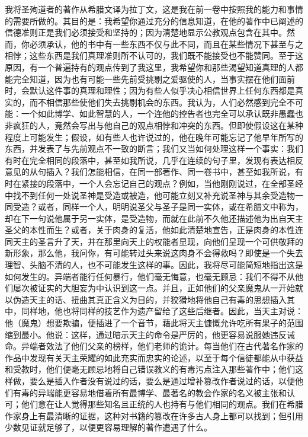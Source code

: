 我将圣殉道者的著作从希腊文译为拉丁文，这是我在前一卷中按照我的能力和事情的需要所做的。其目的是：我希望你通过充分的信息知道，在他的著作中已阐述的信德准则正是我们必须接受和坚持的；因为清楚地显示公教观点包含在其中。然而，你必须承认，他的书中有一些东西不仅与此不同，而且在某些情况下甚至与之相悖；这些东西是我们真理准则所不认可的，我们既不能接受也不能赞同。至于这原因，有一个普遍持有的观点传到了我这里，我希望你和那些渴望知道真理的人都能完全知道，因为也有可能一些先前受挑剔之爱驱使的人，当事实摆在他们面前时，会默认这件事的真理和理性；因为有些人似乎决心相信世界上任何东西都是真实的，而不相信那些使他们失去挑剔机会的东西。我认为，人们必然感到完全不可能：一个如此博学、如此智慧的人，一个连他的控告者也完全可以承认既非愚蠢也非疯狂的人，竟然会写出与他自己的观点相悖和冲突的东西。但即使假设这在某种程度上可能发生；假设，如有些人也许说过的，他在晚年可能忘记了他早年所写的东西，并发表了与先前观点不一致的断言；我们又当如何处理这样一个事实：我们有时在完全相同的段落中，甚至如我所说，几乎在连续的句子里，发现有表达相反意见的从句插入？我们怎能相信，在同一部著作、同一卷书中，甚至如我所说，有时在紧接的段落中，一个人会忘记自己的观点？例如，当他刚刚说过，在全部圣经中找不到任何一处说圣神是受造或被造，他可能立刻又补充说圣神与其余受造物一同受造？或者，同样一个人，明明说圣父与圣子是同一实体，或在希腊文中称为，却在下一句说他属于另一实体，是受造物，而就在此前不久他还描述他为出自天主圣父的本性而生？或者，关于肉身的复活，他如此清楚地宣告，正是肉身的本性连同天主的圣言升了天，并在那里向天上的权能者显现，向他们呈现一个可供敬拜的新形象，那么他，我问你，有可能转过头来说这肉身不会得救吗？即使是一个失去理智、头脑不清的人，也不可能发生这样的事。因此，我将尽可能简短地指出这是如何发生的。异端者能行任何暴行，他们毫无悔意，也毫无顾忌：我们不得不从他们屡次被证实的大胆妄为中认识到这一点。并且，正如他们的父亲魔鬼从一开始就以伪造天主的话、扭曲其真正含义为目的，并狡猾地将他自己有毒的思想插入其中，同样地，他也将同样的技艺作为遗产留给了这些后继者。因此，当天主对说：他（魔鬼）想要欺骗，便插进了一个音节，藉此将天主慷慨允许吃所有果子的范围缩到最小。他说：这样，通过暗示天主的命令是严厉的，他更容易说服她违反诫命。异端者效法了他们父亲的榜样，他们老师的诡计。每当他们在古代著名作家的作品中发现有关天主荣耀的如此充实而忠实的论述，以至于每个信徒都能从中获益和受教时，他们便毫无顾忌地将自己错误教义的有毒污点注入那些著作中；他们这样做，要么是插入作者没有说过的话，要么是通过增补篡改作者说过的话，以便他们有毒的异端能更容易地借着所有最博学、最著名的教会作家的名义被主张和认可；他们意在让人觉得那些知名且正统的人也持有与他们相同的观点。我们在希腊作家身上有最清晰的证据，这种对书籍的篡改在许多古人身上都可以找到；但引用少数见证就足够了，以便更容易理解的著作遭遇了什么。\par

